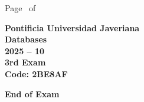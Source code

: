 \documentclass[11pt, addpoints, answers]{exam}\usepackage[utf8]{inputenc}
\begin{document}
\begin{coverpages}
\begin{center}
			\vspace{3mm}
			\leavevmode \hspace{5mm} 
		\end{center}
	\end{coverpages}

	\footer{} {Page \thepage\ of \numpages} {}

	\centering
	\textbf{\Large Pontificia Universidad Javeriana}\\
	\textbf{\Large Databases} \\
	\textbf{\large 2025 -- 10} \\
	\textbf{\large 3rd Exam} \\
	\textbf{Code: 2BE8AF}


	\begin{questions}
		
		
		
		
		
		
		
		
		
		
		
		
		
		
		
		
		
		
		
		
	\end{questions}

	\vspace{5mm}
	\noindent \textbf{End of Exam}
\end{document}

